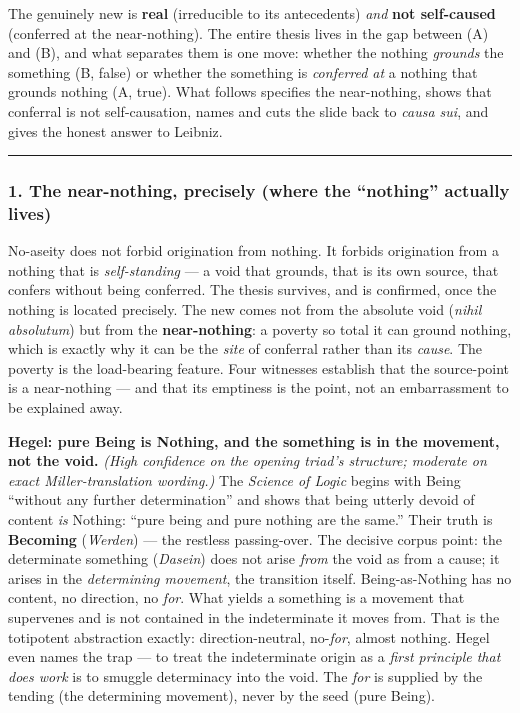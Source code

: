 \documentclass[11pt]{article}
\begin{document}
The genuinely new is \textbf{real} (irreducible to its antecedents) \emph{and} \textbf{not self-caused} (conferred at the near-nothing). The entire thesis lives in the gap between (A) and (B), and what separates them is one move: whether the nothing \emph{grounds} the something (B, false) or whether the something is \emph{conferred at} a nothing that grounds nothing (A, true). What follows specifies the near-nothing, shows that conferral is not self-causation, names and cuts the slide back to \emph{causa sui}, and gives the honest answer to Leibniz.

\medskip\noindent\rule{\linewidth}{0.3pt}\medskip

\subsubsection*{1. The near-nothing, precisely (where the ``nothing'' actually lives)}

No-aseity does not forbid origination from nothing. It forbids origination from a nothing that is \emph{self-standing} — a void that grounds, that is its own source, that confers without being conferred. The thesis survives, and is confirmed, once the nothing is located precisely. The new comes not from the absolute void (\emph{nihil absolutum}) but from the \textbf{near-nothing}: a poverty so total it can ground nothing, which is exactly why it can be the \emph{site} of conferral rather than its \emph{cause}. The poverty is the load-bearing feature. Four witnesses establish that the source-point is a near-nothing — and that its emptiness is the point, not an embarrassment to be explained away.

\textbf{Hegel: pure Being is Nothing, and the something is in the movement, not the void.} \emph{(High confidence on the opening triad's structure; moderate on exact Miller-translation wording.)} The \emph{Science of Logic} begins with Being ``without any further determination'' and shows that being utterly devoid of content \emph{is} Nothing: ``pure being and pure nothing are the same.'' Their truth is \textbf{Becoming} (\emph{Werden}) — the restless passing-over. The decisive corpus point: the determinate something (\emph{Dasein}) does not arise \emph{from} the void as from a cause; it arises in the \emph{determining movement}, the transition itself. Being-as-Nothing has no content, no direction, no \emph{for}. What yields a something is a movement that supervenes and is not contained in the indeterminate it moves from. That is the totipotent abstraction exactly: direction-neutral, no-\emph{for}, almost nothing. Hegel even names the trap — to treat the indeterminate origin as a \emph{first principle that does work} is to smuggle determinacy into the void. The \emph{for} is supplied by the tending (the determining movement), never by the seed (pure Being).
\end{document}
